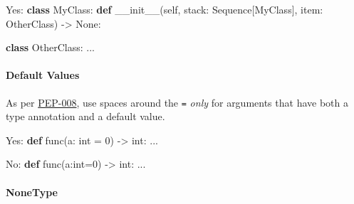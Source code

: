 \documentclass[
]{article}
\newenvironment{Shaded}{}{}
\newcommand{\BuiltInTok}[1]{\textcolor[rgb]{0.00,0.50,0.00}{#1}}
\newcommand{\DecValTok}[1]{\textcolor[rgb]{0.25,0.63,0.44}{#1}}
\newcommand{\FunctionTok}[1]{\textcolor[rgb]{0.02,0.16,0.49}{#1}}
\newcommand{\KeywordTok}[1]{\textcolor[rgb]{0.00,0.44,0.13}{\textbf{#1}}}
\newcommand{\NormalTok}[1]{#1}
\newcommand{\OperatorTok}[1]{\textcolor[rgb]{0.40,0.40,0.40}{#1}}
\newcommand{\StringTok}[1]{\textcolor[rgb]{0.25,0.44,0.63}{#1}}
\newcommand{\VariableTok}[1]{\textcolor[rgb]{0.10,0.09,0.49}{#1}}
\begin{document}
\begin{samepage}
\begin{Shaded}
\begin{Highlighting}[]
\NormalTok{Yes:}
\KeywordTok{class}\NormalTok{ MyClass:}
  \KeywordTok{def} \FunctionTok{\_\_init\_\_}\NormalTok{(}\VariableTok{self}\NormalTok{, stack: Sequence[}\StringTok{\textquotesingle{}MyClass\textquotesingle{}}\NormalTok{], item: }\StringTok{\textquotesingle{}OtherClass\textquotesingle{}}\NormalTok{) }\OperatorTok{{-}\textgreater{}} \VariableTok{None}\NormalTok{:}

\KeywordTok{class}\NormalTok{ OtherClass:}
\NormalTok{  ...}
\end{Highlighting}
\end{Shaded}
\end{samepage}

\paragraph{Default Values}

As per
\href{https://peps.python.org/pep-0008/\#other-recommendations}{PEP-008},
use spaces around the \texttt{=} \emph{only} for arguments that have
both a type annotation and a default value.

\begin{samepage}
\begin{Shaded}
\begin{Highlighting}[]
\NormalTok{Yes:}
\KeywordTok{def}\NormalTok{ func(a: }\BuiltInTok{int} \OperatorTok{=} \DecValTok{0}\NormalTok{) }\OperatorTok{{-}\textgreater{}} \BuiltInTok{int}\NormalTok{:}
\NormalTok{  ...}
\end{Highlighting}
\end{Shaded}
\end{samepage}

\begin{samepage}
\begin{Shaded}
\begin{Highlighting}[]
\NormalTok{No:}
\KeywordTok{def}\NormalTok{ func(a:}\BuiltInTok{int}\OperatorTok{=}\DecValTok{0}\NormalTok{) }\OperatorTok{{-}\textgreater{}} \BuiltInTok{int}\NormalTok{:}
\NormalTok{  ...}
\end{Highlighting}
\end{Shaded}
\end{samepage}

\paragraph{NoneType}
\end{document}
